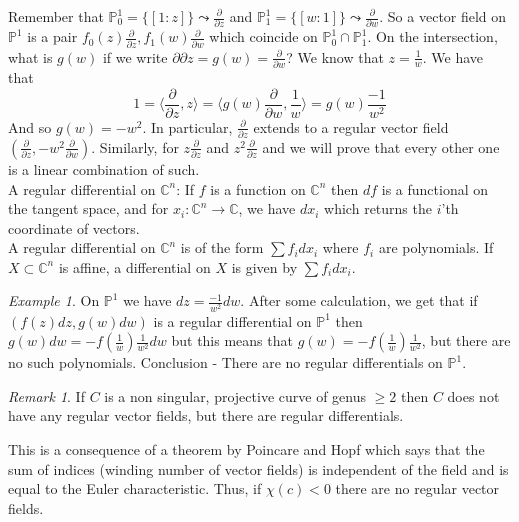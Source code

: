 \documentclass[12pt]{article}
\theoremstyle{remark}
\newtheorem{remark}[theorem]{Remark}
\newtheorem{example}[theorem]{Example}
\newcommand{\C}{\mathbb{C}}
\newcommand{\Pp}{\mathbb{P}}
\begin{document}
Remember that $\Pp_0^1 = \{ [1:z] \} \leadsto \frac{\partial}{\partial z}$ and $\Pp_1^1 = \{ [w:1] \} \leadsto \frac{\partial}{\partial w}$. So a vector field on $\Pp^1$ is a pair $f_0(z) \frac{\partial}{\partial z} , f_1(w) \frac{\partial}{\partial w}$ which coincide on $\Pp_0^1 \cap \Pp_1^1$. On the intersection, what is $g(w)$ if we write ${\partial}{\partial z} = g(w) = \frac{\partial}{\partial w}$? We know that $z = \frac{1}{w}$. 
We have that $$ 1 = \langle \frac{\partial}{\partial z} , z \rangle = \langle g(w) \frac{\partial}{\partial w} , \frac{1}{w} \rangle = g(w)\frac{-1}{w^2} $$
And so $g(w) = -w^2$. In particular, $\frac{\partial}{\partial z}$ extends to a regular vector field $(\frac{\partial}{\partial z} , -w^2 \frac{\partial}{\partial w})$. Similarly, for $z \frac{\partial}{\partial z}$ and $z^2 \frac{\partial}{\partial z}$ and we will prove that every other one is a linear combination of such.\\

A regular differential on $\C^n$: If $f$ is a function on $\C^n$ then $df$ is a functional on the tangent space,  and for $x_i:\C^n \rightarrow \C$, we have $dx_i$ which returns the $i$'th coordinate of vectors. \\

A regular differential on $\C^n$ is of the form $\sum f_i dx_i$ where $f_i$ are polynomials. If $X \subset \C^n$ is affine, a differential on $X$ is given by $\sum f_i dx_i$.

\begin{example}
On $\Pp^1$ we have $dz = \frac{-1}{w^2} dw$. After some calculation, we get that if $(f(z)dz, g(w) dw)$ is a regular differential on $\Pp^1$ then $g(w) dw = -f(\frac{1}{w}) \frac{1}{w^2} dw$ but this means that $g(w) = -f(\frac{1}{w}) \frac{1}{w^2}$, but there are no such polynomials. Conclusion - There are no regular differentials on $\Pp^1$.

\end{example}


\begin{remark}
If $C$ is a non singular, projective curve of genus $\geq 2$ then $C$ does not have any regular vector fields, but there are regular differentials.
\end{remark}

This is a consequence of a theorem by Poincare and Hopf which says that the sum of indices (winding number of vector fields) is independent of the field and is equal to the Euler characteristic. 
Thus, if $\chi(c) <0$ there are no regular vector fields.\\
\end{document}
